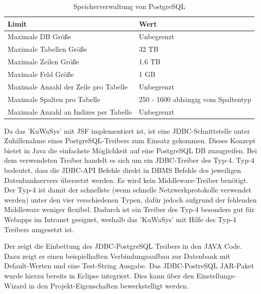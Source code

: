 \begin{table}[H]
\begin{center}
	\begin{tabular}{|l|l|}\hline
		\textbf{Limit} & \textbf{Wert} \\ \hline	
		Maximale DB Größe & Unbegrenzt \\ \hline \hline
		Maximale Tabellen Größe & 32 TB \\ \hline \hline
		Maximale Zeilen Größe & 1.6 TB \\ \hline \hline
		Maximale Feld Größe & 1 GB \\ \hline \hline	
		Maximale Anzahl der Zeile pro Tabelle & Unbegrenzt \\ \hline \hline
		Maximale Spalten pro Tabelle &	250 - 1600 abhängig vom Spaltentyp \\ \hline \hline
		Maximale Anzahl an Indizes per Tabelle & Unbegrenzt \\ \hline \hline
	\end{tabular}
	\caption{Speicherverwaltung von PostgreSQL}
	\label{tab:PostgreSQLValues}
\end{center}
\end{table}

Da das 'KuWaSys' mit JSF implementiert ist, ist eine \gls{JDBC}-Schnittstelle unter Zuhilfenahme eines PostgreSQL-Treibers zum Einsatz gekommen. Dieses Konzept bietet in Java die einfachste Möglichkeit auf eine PostgreSQL \ac{DB} zuzugreifen. Bei dem verwendeten Treiber handelt es sich um ein JDBC-Treiber des Typ-4. 
Typ-4 bedeutet, dass die JDBC-API Befehle direkt in \ac{DBMS} Befehle des jeweiligen Datenbankservers übersetzt werden.
Es wird kein Middleware-Treiber benötigt. 
Der Typ-4 ist damit der schnellste (wenn schnelle Netzwerkprotokolle verwendet werden) unter den vier verschiedenen Typen, dafür jedoch aufgrund der fehlenden Middleware weniger flexibel.
Dadurch ist ein Treiber des Typ-4 besonders gut für Webapps im Intranet geeignet, weshalb das 'KuWaSys' mit Hilfe des Typ-4 Treibers umgesetzt ist.

Der  zeigt die Einbettung des JDBC-PostgreSQL Treibers in den JAVA Code. Dazu zeigt er einen beispielhaften Verbindungsaufbau zur Datenbank mit Default-Werten und eine Test-String Ausgabe. Das JDBC-PostreSQL \gls{JAR}-Paket wurde hierzu bereits in Eclipse integriert. Dies kann über den Einstellungs-Wizard in den Projekt-Eigenschaften bewerkstelligt werden. 

	
